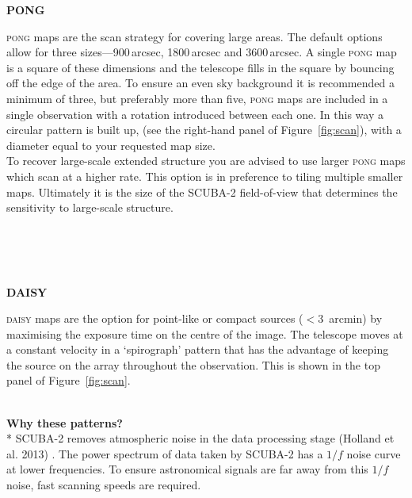 \documentclass[twoside,11pt]{article}
\newcommand{\htmlref}[2]{#1}
\newcommand{\latex}[1]{#1}
\newcommand{\latexhtml}[2]{#1}
\renewcommand{\_}{\texttt{\symbol{95}}}
\newcommand{\cref}[3]{\latexhtml{#1~\ref{#2}}{\htmlref{#3}{#2}}}
\begin{document}
\begin{minipage}[t]{0.15\linewidth}
\textbf{PONG}
\end{minipage}
\begin{minipage}[t]{0.85\linewidth}\textsc{pong} maps are the scan
strategy for covering large areas. The default options allow for three
sizes---900\,arcsec, 1800\,arcsec and 3600\,arcsec. A single \textsc{pong} map is
a square of these dimensions and the telescope fills in the square by
bouncing off the edge of the area. To ensure an even sky background it
is recommended a minimum of three, but preferably more than five,
\textsc{pong} maps are included in a single observation with a
rotation introduced between each one. In this way a circular pattern
is built up, (see the right-hand panel of \cref{Figure}{fig:scan}{graphic below}),
with a diameter equal to your requested map size.
\vspace{0.2cm}\\
To recover large-scale extended structure you are advised to use
larger \textsc{pong} maps which scan at a higher rate. This option is
in preference to tiling multiple smaller maps. Ultimately it is the
size of the SCUBA-2 field-of-view that determines the sensitivity to
large-scale structure.
\end{minipage}
\latex{\\ \\ \\}
\begin{minipage}[t]{0.15\linewidth}
\textbf{DAISY}
\end{minipage}
\begin{minipage}[t]{0.85\linewidth}
\textsc{daisy} maps are the option for point-like or compact sources
($<$3~arcmin) by maximising the exposure time on the centre of the
image. The telescope moves at a constant velocity in a `spirograph'
pattern that has the advantage of keeping the source on the array
throughout the observation. This is shown in the top panel of
\cref{Figure}{fig:scan}{the figure below}.
\end{minipage}
\latex{\vspace{1.5cm}}\\
\textbf{Why these patterns?}\\*
SCUBA-2 removes atmospheric noise in the data
processing stage (Holland et al. 2013) \cite{s2main}. The power spectrum
of data taken by SCUBA-2 has a $1/f$ noise curve at lower frequencies. To
ensure astronomical signals are far away from this $1/f$ noise, fast
scanning speeds are required.
\end{document}
